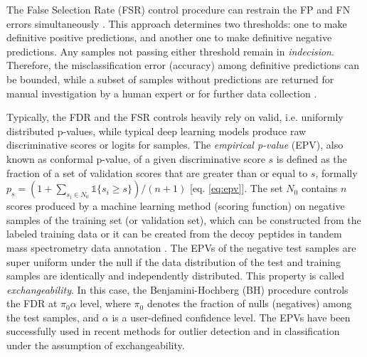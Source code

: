 \documentclass{article}
\newcommand{\mathone}{\mathds{1}}
\begin{document}
The False Selection Rate (FSR) control procedure can restrain the FP and FN errors simultaneously \cite{zhao2023controlling}. This approach determines two thresholds: one to make definitive positive predictions, and another one to make definitive negative predictions. Any samples not passing either threshold remain in {\em indecision}. Therefore, the misclassification error (accuracy) among definitive predictions can be bounded, while a subset of samples without predictions are returned for manual investigation by a human expert or for further data collection \cite{rava2021burden}. 

Typically, the FDR and the FSR controls heavily rely on valid, i.e. uniformly distributed p-values, while typical deep learning models produce raw discriminative scores or logits for samples.  
The {\em empirical p-value} (EPV), also known as conformal p-value, of a given discriminative score $s$ is defined as the fraction of a set of validation scores that are greater than or equal to $s$, formally $p_s=(1+\sum_{s_i\in N_0} \mathone\{s_i \ge s\})/(n+1) \label{eq:epv}$ [eq. \ref{eq:epv}]. The set $N_0$ contains $n$ scores produced by a machine learning method (scoring function) on negative samples of the training set (or validation set), which can be constructed from the labeled training data or it can be created from the decoy peptides in tandem mass spectrometry data annotation \cite{elias2007target,danilova2019bias}. The EPVs of the negative test samples are super uniform under the null if the data distribution of the test and training samples are identically and independently distributed. This property is called {\em exchangeability}. In this case, the Benjamini-Hochberg (BH) procedure controls the FDR at $\pi_0\alpha$ level, where $\pi_0$ denotes the fraction of nulls (negatives) among the test samples, and $\alpha$ is a user-defined confidence level. The EPVs have been successfully used in recent methods for outlier detection \cite{bates2023testing,marandon2023adaptive} and in classification \cite{rava2021burden, angelopoulos2021learn} under the assumption of exchangeability. %
\end{document}
